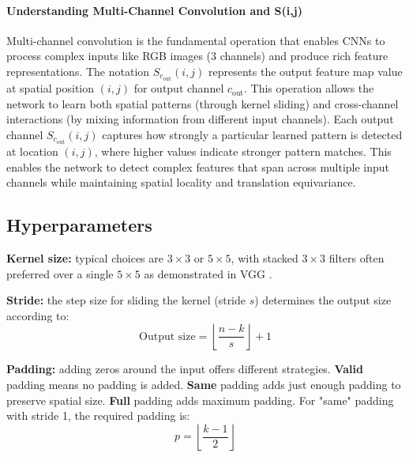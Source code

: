 \paragraph{Understanding Multi-Channel Convolution and S(i,j)}
Multi-channel convolution is the fundamental operation that enables CNNs to process complex inputs like RGB images (3 channels) and produce rich feature representations. The notation $S_{c_{\text{out}}}(i,j)$ represents the output feature map value at spatial position $(i,j)$ for output channel $c_{\text{out}}$. This operation allows the network to learn both spatial patterns (through kernel sliding) and cross-channel interactions (by mixing information from different input channels). Each output channel $S_{c_{\text{out}}}(i,j)$ captures how strongly a particular learned pattern is detected at location $(i,j)$, where higher values indicate stronger pattern matches. This enables the network to detect complex features that span across multiple input channels while maintaining spatial locality and translation equivariance.

\subsection{Hyperparameters}

\textbf{Kernel size:} typical choices are $3 \times 3$ or $5 \times 5$, with stacked $3\times3$ filters often preferred over a single $5\times5$ as demonstrated in VGG \cite{GoodfellowEtAl2016}.

\textbf{Stride:} the step size for sliding the kernel (stride $s$) determines the output size according to:
\begin{equation}
\text{Output size} = \left\lfloor \frac{n - k}{s} \right\rfloor + 1
\end{equation}

\textbf{Padding:} adding zeros around the input offers different strategies. \textbf{Valid} padding means no padding is added. \textbf{Same} padding adds just enough padding to preserve spatial size. \textbf{Full} padding adds maximum padding. For "same" padding with stride 1, the required padding is:
\begin{equation}
p = \left\lfloor \frac{k-1}{2} \right\rfloor
\end{equation}


